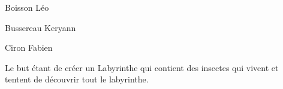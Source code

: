 
\begin{DoxyItemize}
\item Boisson Léo
\item Bussereau Keryann
\item Ciron Fabien
\end{DoxyItemize}

Le but étant de créer un Labyrinthe qui contient des insectes qui vivent et tentent de découvrir tout le labyrinthe. 